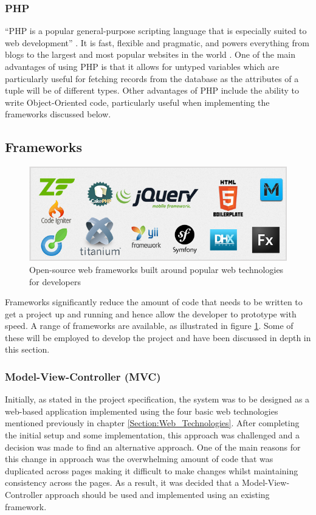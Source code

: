 \subsubsection{PHP} 
``PHP is a popular general-purpose scripting language that is especially suited to web development'' \cite{PHP:Home}. It is fast, flexible and pragmatic, and powers everything from blogs to the largest and most popular websites in the world \cite{PHP:Home}. One of the main advantages of using PHP is that it allows for untyped variables which are particularly useful for fetching records from the database as the attributes of a tuple will be of different types. Other advantages of PHP include the ability to write Object-Oriented code, particularly useful when implementing the frameworks discussed below.

\subsection{Frameworks}
\begin{figure}[H]
  \centering
  \includegraphics[width=1.0\textwidth]{Images/Research/Technologies/WebFrameworks}
  \caption{Open-source web frameworks built around popular web technologies for developers} \label{fig:WebFrameworks} 
\end{figure}

Frameworks significantly reduce the amount of code that needs to be written to get a project up and running and hence allow the developer to prototype with speed. A range of frameworks are available, as illustrated in figure \ref{fig:WebFrameworks}. Some of these will be employed to develop the project and have been discussed in depth in this section.

\subsubsection{Model-View-Controller (MVC)}
Initially, as stated in the project specification, the system was to be designed as a web-based application implemented using the four basic web technologies mentioned previously in chapter \ref{Section:Web_Technologies}. After completing the initial setup and some implementation, this approach was challenged and a decision was made to find an alternative approach. One of the main reasons for this change in approach was the overwhelming amount of code that was duplicated across pages making it difficult to make changes whilst maintaining consistency across the pages. As a result, it was decided that a Model-View-Controller approach should be used and implemented using an existing framework.

